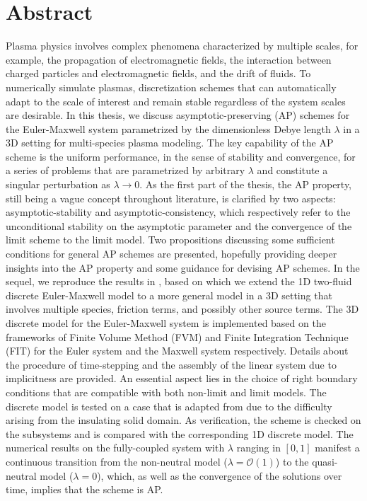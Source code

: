 \documentclass{report}
\begin{document}
\chapter*{Abstract}
Plasma physics involves complex phenomena characterized by multiple scales, for example, the propagation of electromagnetic fields, the interaction between charged particles and electromagnetic fields, and the drift of fluids. To numerically simulate plasmas, discretization schemes that can automatically adapt to the scale of interest and remain stable regardless of the system scales are desirable. In this thesis, we discuss asymptotic-preserving (AP) schemes for the Euler-Maxwell system parametrized by the dimensionless Debye length $\lambda$ in a 3D setting for multi-species plasma modeling. The key capability of the AP scheme is the uniform performance, in the sense of stability and convergence, for a series of problems that are parametrized by arbitrary $\lambda$ and constitute a singular perturbation as $\lambda \rightarrow 0$. As the first part of the thesis, the AP property, still being a vague concept throughout literature, is clarified by two aspects: asymptotic-stability and asymptotic-consistency, which respectively refer to the unconditional stability on the asymptotic parameter and the convergence of the limit scheme to the limit model. Two propositions discussing some sufficient conditions for general AP schemes are presented, hopefully providing deeper insights into the AP property and some guidance for devising AP schemes. In the sequel, we reproduce the results in \cite{degond_2012}, based on which we extend the 1D two-fluid discrete Euler-Maxwell model to a more general model in a 3D setting that involves multiple species, friction terms, and possibly other source terms. The 3D discrete model for the Euler-Maxwell system is implemented based on the frameworks of Finite Volume Method (FVM) and Finite Integration Technique (FIT) for the Euler system and the Maxwell system respectively. Details about the procedure of time-stepping and the assembly of the linear system due to implicitness are provided. An essential aspect lies in the choice of right boundary conditions that are compatible with both non-limit and limit models. The discrete model is tested on a case that is adapted from \cite{fuchs_2021} due to the difficulty arising from the insulating solid domain. As verification, the scheme is checked on the subsystems and is compared with the corresponding 1D discrete model. The numerical results on the fully-coupled system with $\lambda$ ranging in $[0,1]$ manifest a continuous transition from the non-neutral model ($\lambda = \mathcal{O}(1)$) to the quasi-neutral model ($\lambda = 0$), which, as well as the convergence of the solutions over time, implies that the scheme is AP.                             
\end{document}
